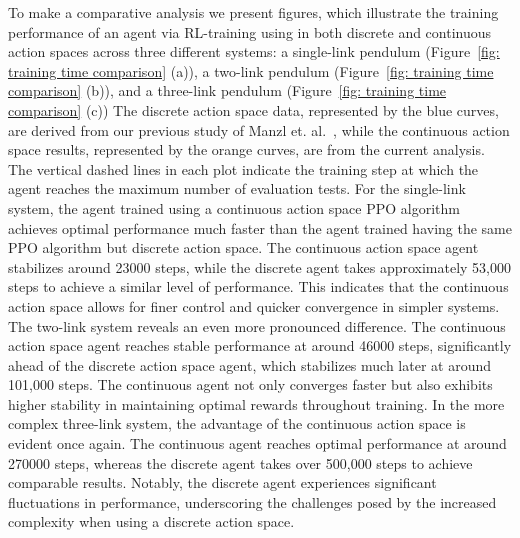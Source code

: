 To make a comparative analysis we present figures, which illustrate the training performance of an agent via RL-training using in both discrete and continuous action spaces across three different systems: a single-link pendulum (Figure~\ref{fig: training time comparison} (a)), a two-link pendulum (Figure~\ref{fig: training time comparison} (b)), and a three-link pendulum (Figure~\ref{fig: training time comparison} (c)) The discrete action space data, represented by the blue curves, are derived from our previous study of Manzl et. al.~\cite{manzl2023relrl}, while the continuous action space results, represented by the orange curves, are from the current analysis. The vertical dashed lines in each plot indicate the training step at which the agent reaches the maximum number of evaluation tests.
For the single-link system, the agent trained using a continuous action space PPO algorithm achieves optimal performance much faster than the agent trained having the same PPO algorithm but discrete action space. The continuous action space agent stabilizes around 23000 steps, while the discrete agent takes approximately 53,000 steps to achieve a similar level of performance. This indicates that the continuous action space allows for finer control and quicker convergence in simpler systems. The two-link system reveals an even more pronounced difference. The continuous action space agent reaches stable performance at around 46000 steps, significantly ahead of the discrete action space agent, which stabilizes much later at around 101,000 steps. The continuous agent not only converges faster but also exhibits higher stability in maintaining optimal rewards throughout training. In the more complex three-link system, the advantage of the continuous action space is evident once again. The continuous agent reaches optimal performance at around 270000 steps, whereas the discrete agent takes over 500,000 steps to achieve comparable results. Notably, the discrete agent experiences significant fluctuations in performance, underscoring the challenges posed by the increased complexity when using a discrete action space.

